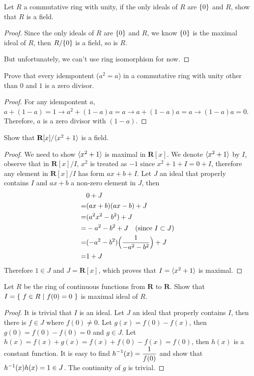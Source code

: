 \documentclass[../main.tex]{subfiles}
\begin{document}
\begin{exercise}
  Let $R$ a commutative ring with unity, if the only ideals of $R$
  are $\{0\}$ and $R$, show that $R$ is a field.
\end{exercise}
\begin{proof}
  Since the only ideals of $R$ are $\{0\}$ and $R$, we know $\{0\}$
  is the maximal ideal of $R$, then $R/\{0\}$ is a field, so is $R$.

  But unfortunately, we can't use ring isomorphism for now.
\end{proof}

\begin{exercise}
  Prove that every idempontent ($a^2 = a$) in a commutative ring with
  unity other than $0$ and $1$ is a zero divisor.
\end{exercise}
\begin{proof}
  For any idempontent $a$, 
  $a + (1 - a) = 1 \rightarrow a^2 + (1 - a)a = a \rightarrow a + (1 - a)a = a \rightarrow (1 - a)a = 0$.
  Therefore, $a$ is a zero divisor with $(1 - a)$.
\end{proof}

\begin{exercise}
  Show that $\textbf{R}[x]/\langle x^2 + 1 \rangle$ is a field.
\end{exercise}
\begin{proof}
  We need to show $\langle x^2 + 1 \rangle$ is maximal in $\textbf{R}[x]$.
  We denote $\langle x^2 + 1 \rangle$ by $I$,
  observe that in $\textbf{R}[x]/I$, 
  $x^2$ is treated as $-1$ since $x^2 + 1 + I = 0 + I$,
  therefore any element in $\textbf{R}[x]/I$ has form
  $ax + b + I$.
  Let $J$ an ideal that properly contains $I$ and
  $ax + b$ a non-zero element in $J$,
  then
  \begin{align*}
     & 0 + J \\
    =& (ax + b)(ax - b) + J \\
    =& (a^2x^2 - b^2) + J \\
    =& - a^2 - b^2 + J \quad \text{(since $I \subset J$)} \\
    =& (- a^2 - b^2)\Bigl( \frac{1}{- a^2 - b^2} \Bigr) + J \\
    =& 1 + J
  \end{align*}
  Therefore $1 \in J$ and $J = \textbf{R}[x]$, which proves that
  $I = \langle x^2 + 1 \rangle$ is maximal.
\end{proof}

\setcounter{exercise}{44}
\begin{exercise}
  Let $R$ be the ring of continuous functions from $\textbf{R}$ to $\textbf{R}$.
  Show that $I = \{ \ f \in R \ | \ f(0) = 0 \ \}$ is maximal ideal of $R$.
\end{exercise}
\begin{proof}
  It is trivial that $I$ is an ideal.
  Let $J$ an ideal that properly contains $I$, then there is
  $f \in J$ where $f(0) \neq 0$.
  Let $g(x) = f(0) - f(x)$, then $g(0) = f(0) - f(0) = 0$ and $g \in J$.
  Let $h(x) = f(x) + g(x) = f(x) + f(0) - f(x) = f(0)$,
  then $h(x)$ is a constant function.
  It is easy to find $\displaystyle h^{-1}(x) = \frac{1}{f(0)}$
  and show that $h^{-1}(x)h(x) = 1 \in J$.
  The continuity of $g$ is trivial.
\end{proof}
\end{document}
